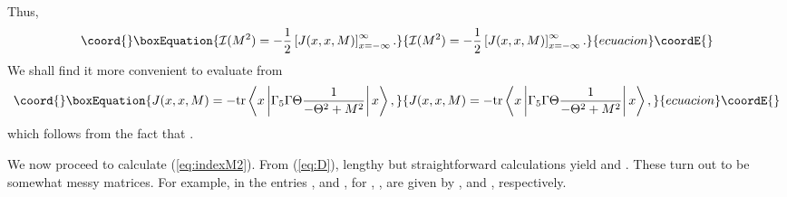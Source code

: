 \documentclass[a4paper,preprint,preprintnumbers,amsmath,amssymb]{revtex4}
\begin{document}
%
Thus,
\begin{equation}\coord{}\boxEquation{
   {\cal I}(M^2) 
   = - \frac{1}{2} \left[ J(x,x,M) \right]_{x= -\infty}^{\infty}.
      \label{eq:indexM2}
}{
   {\cal I}(M^2) 
   = - \frac{1}{2} \left[ J(x,x,M) \right]_{x= -\infty}^{\infty}.
      }{ecuacion}\coordE{}\end{equation}
We shall find it more convenient to evaluate \coordHE{} from
\begin{equation}\coord{}\boxEquation{
   J(x,x,M)  =  - \hbox{tr} \left\langle x \left| 
             \Gamma_5 \Gamma \Theta \frac{1}{-\Theta^2 + M^2}
       	       	       	   \right| x \right\rangle,
      \label{eq:Jalt}
}{
   J(x,x,M)  =  - \hbox{tr} \left\langle x \left| 
             \Gamma_5 \Gamma \Theta \frac{1}{-\Theta^2 + M^2}
       	       	       	   \right| x \right\rangle,
      }{ecuacion}\coordE{}\end{equation}
which follows from the fact that 
\coordHE{}.

We now proceed to calculate (\ref{eq:indexM2}).
From (\ref{eq:D}), lengthy but straightforward calculations yield 
\coordHE{} and
\coordHE{}. These turn out to be somewhat messy
matrices. For example, in \coordHE{} the entries
\coordHE{}, \coordHE{} and \coordHE{}, for \coordHE{}, \coordHE{}, 
are given by 
\coordHE{},
\coordHE{}
and
\coordHE{}, respectively.
\end{document}
